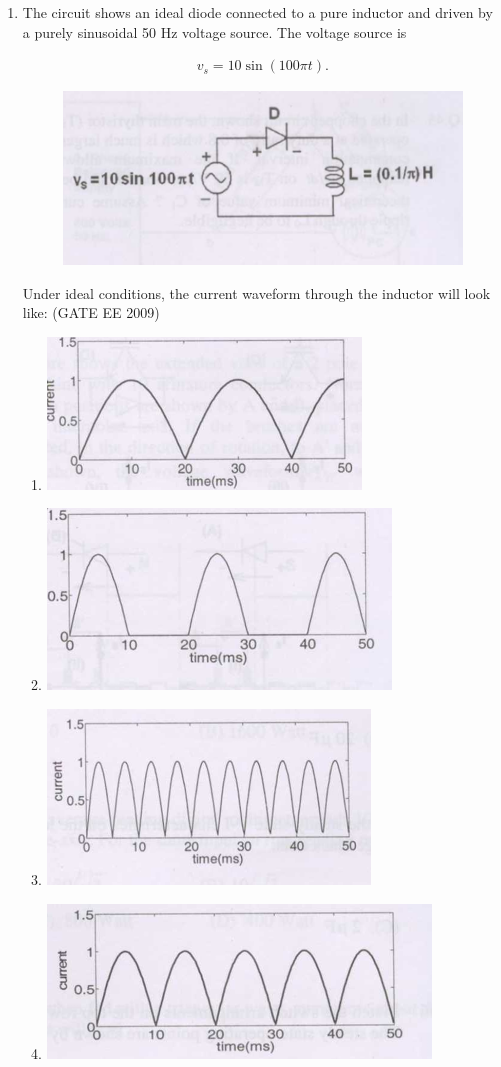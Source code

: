 \documentclass[journal,12pt,onecolumn]{IEEEtran}
\theoremstyle{remark}
\begin{document}
\begin{flushleft}
\begin{enumerate}
\item The circuit shows an ideal diode connected to a pure inductor and driven by a purely sinusoidal 50 Hz voltage source. The voltage source is 

\begin{align*}
v_s = 10 \sin(100 \pi t).
\end{align*}
\begin{figure}[h!]
    \centering
    \includegraphics[width=0.5\columnwidth]{figs/Screenshot 2025-08-08 215519.png}
\label{fig:placeholder}
\caption{}
\end{figure}

Under ideal conditions, the current waveform through the inductor will look like:
\hfill(GATE EE 2009)
\begin{enumerate}
        \item \includegraphics[width=0.4\columnwidth]{figs/Screenshot 2025-08-08 215542.png}
    \item \includegraphics[width=0.4\columnwidth]{figs/Screenshot 2025-08-08 215551.png} 
    \item \includegraphics[width=0.4\columnwidth]{figs/Screenshot 2025-08-08 215529.png} 
   \item  \includegraphics[width=0.4\columnwidth]{figs/Screenshot 2025-08-08 215536.png} 
\end{enumerate}


\end{enumerate}
\end{flushleft}
\end{document}
